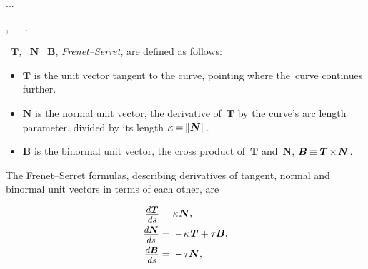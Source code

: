 \begin{otherlanguage}{russian}
...

\newpage

,      \:---  .

~$\bm{T}$, ~$\bm{N}$  ~$\bm{B}$,  \emph{Frenet--Serret}, are defined as follows:
\begin{itemize}
\item $\bm{T}$ is the unit vector tangent to the curve, pointing where the~curve continues further.
\item $\bm{N}$ is the normal unit vector, the derivative of~$\bm{T}$ by the curve’s arc length parameter, divided by its length ${ \kappa \hspace{-0.1ex} = \hspace{-0.25ex} \| \bm{N} \| }$.
\item $\bm{B}$ is the binormal unit vector, the cross product of~$\bm{T}$ and~$\bm{N}$, ${\bm{B} \hspace{-0.1ex} \equiv \bm{T} \hspace{-0.15ex} \times \hspace{-0.3ex} \bm{N}}$.
\end{itemize}

The Frenet--Serret formulas, describing derivatives of tangent, normal and binormal unit vectors in terms of each other, are

\begin{align*}
\scalebox{.88}{$ \displaystyle\frac{\raisemath{-0.2em}{ d\hspace{.1ex}\bm{T} }}{ds} $} &= \kappa \hspace{.1ex} \bm{N} ,
\\
\scalebox{.88}{$ \displaystyle\frac{\raisemath{-0.2em}{ d\bm{N} }}{ds} $} &= {}- \hspace{-0.3ex} \kappa \hspace{.25ex} \bm{T} + \tau \hspace{-0.1ex} \bm{B} ,
\\
\scalebox{.88}{$ \displaystyle\frac{\raisemath{-0.2em}{ d\bm{B} }}{ds} $} &= {}- \hspace{-0.3ex} \tau \hspace{-0.1ex} \bm{N} ,
\end{align*}


\end{otherlanguage}
